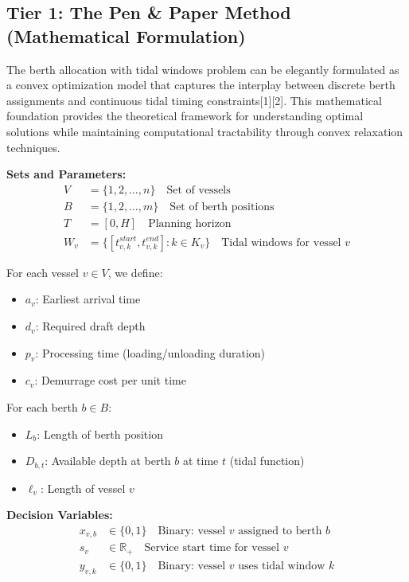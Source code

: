 \documentclass{article}
\begin{document}
\subsection{Tier 1: The Pen \& Paper Method (Mathematical Formulation)}

The berth allocation with tidal windows problem can be elegantly formulated as a convex optimization model that captures the interplay between discrete berth assignments and continuous tidal timing constraints[1][2]. This mathematical foundation provides the theoretical framework for understanding optimal solutions while maintaining computational tractability through convex relaxation techniques.

\textbf{Sets and Parameters:}
\begin{align}
V &= \{1, 2, \ldots, n\} \quad \text{Set of vessels} \\
B &= \{1, 2, \ldots, m\} \quad \text{Set of berth positions} \\
T &= [0, H] \quad \text{Planning horizon} \\
W_v &= \{[t_{v,k}^{start}, t_{v,k}^{end}] : k \in K_v\} \quad \text{Tidal windows for vessel } v
\end{align}

For each vessel $v \in V$, we define:
\begin{itemize}
\item $a_v$: Earliest arrival time
\item $d_v$: Required draft depth
\item $p_v$: Processing time (loading/unloading duration)
\item $c_v$: Demurrage cost per unit time
\end{itemize}

For each berth $b \in B$:
\begin{itemize}
\item $L_b$: Length of berth position
\item $D_{b,t}$: Available depth at berth $b$ at time $t$ (tidal function)
\item $\ell_v$: Length of vessel $v$
\end{itemize}

\textbf{Decision Variables:}
\begin{align}
x_{v,b} &\in \{0, 1\} \quad \text{Binary: vessel } v \text{ assigned to berth } b \\
s_v &\in \mathbb{R}_+ \quad \text{Service start time for vessel } v \\
y_{v,k} &\in \{0, 1\} \quad \text{Binary: vessel } v \text{ uses tidal window } k
\end{align}
\end{document}
